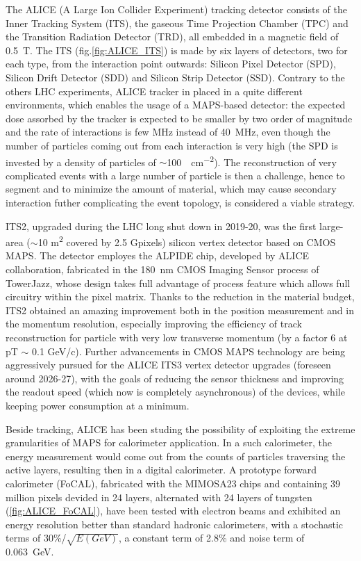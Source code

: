         The ALICE (A Large Ion Collider Experiment) tracking detector consists of the Inner Tracking System (ITS), the gaseous Time Projection Chamber (TPC) and the Transition Radiation Detector (TRD), all embedded in a magnetic field of \SI{0.5}{T}. The ITS (fig.\ref{fig:ALICE_ITS}) is made by six layers of detectors, two for each type, from the interaction point outwards: Silicon Pixel Detector (SPD), Silicon Drift Detector (SDD) and Silicon Strip Detector (SSD).         
        Contrary to the others LHC experiments, ALICE tracker in placed in a quite different environments, which enables the usage of a MAPS-based detector: the expected dose assorbed by the tracker is expected to be smaller by two order of magnitude and the rate of interactions is few \si{MHz} instead of \SI{40}{MHz}, even though the number of particles coming out from each interaction is very high (the SPD is invested by a density of particles of $\sim$\SI{100}{\per cm\tothe{-2}}).  
        The reconstruction of very complicated events with a large number of particle is then a challenge, hence to segment and to minimize the amount of material, which may cause secondary interaction futher complicating the event topology, is considered a viable strategy. 
        
        ITS2, upgraded during the LHC long shut down in 2019-20, was the first large-area ($\sim$10 \si{m\squared} covered by 2.5 Gpixels) silicon vertex detector based on CMOS MAPS.
        The detector employes the ALPIDE chip, developed by ALICE collaboration, fabricated in the \SI{180}{nm} CMOS Imaging Sensor process of TowerJazz, whose design takes full advantage of process feature which allows full circuitry within the pixel matrix.
        Thanks to the reduction in the material budget, ITS2 obtained an amazing improvement both in the position measurement and in the momentum resolution, especially improving the efficiency of track reconstruction for particle with very low transverse momentum (by a factor 6 at pT $\sim$ 0.1 GeV/c). Further advancements in CMOS MAPS technology are being aggressively pursued for the ALICE ITS3 vertex detector upgrades (foreseen around 2026-27), with the goals of reducing the sensor thickness and improving the readout speed (which now is completely asynchronous) of the devices, while keeping power consumption at a minimum.

        Beside tracking, ALICE has been studing the possibility of exploiting the extreme granularities of MAPS for calorimeter application\cite{review_calo}. In a such calorimeter, the energy measurement would come out from the counts of particles traversing the active layers, resulting then in a digital calorimeter. A prototype forward calorimeter (FoCAL), fabricated with the MIMOSA23 chips and containing 39 million pixels devided in 24 layers, alternated with 24 layers of tungsten (\ref{fig:ALICE_FoCAL}), have been tested with electron beams and exhibited an energy resolution better than standard hadronic calorimeters, with a stochastic terms of 30\%/$\sqrt{E(GeV)}$, a constant term of 2.8\% and noise term of \SI{0.063}{GeV}.

